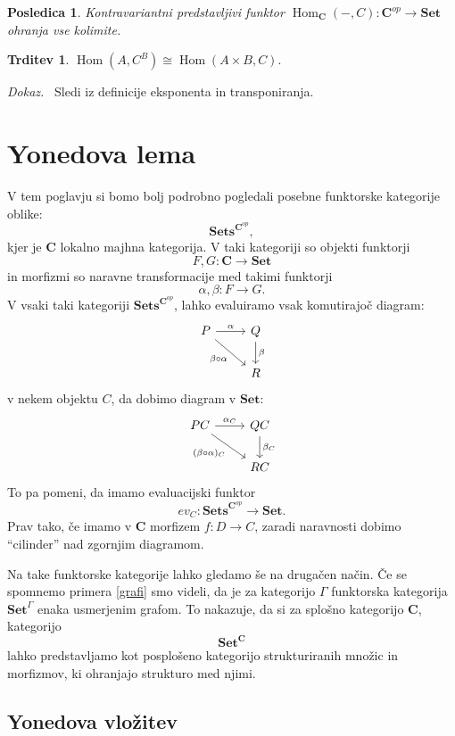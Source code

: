 \documentclass[12pt,a4paper]{book}
\theoremstyle{definition}
\theoremstyle{plain}
\newtheorem{trditev}[definicija]{Trditev}
\newtheorem{posledica}{Posledica}[definicija]
\newenvironment{dokaz}{\emph{Dokaz.}\ }{\hspace{\fill}{$\Box$}}
\theoremstyle{definition}
\theoremstyle{remark}
\newcommand{\cat}[1]{\textbf{#1}}
\DeclareMathOperator{\Hom}{Hom}
\newcommand{\predsnop}[1]{\cat{Sets}^{\cat{#1}^{op}}}
\begin{document}
\begin{posledica}
Kontravariantni predstavljivi funktor $\Hom_\cat{C}(-,C) : \cat{C}^{op} \to \cat{Set}$ ohranja vse kolimite.
\end{posledica}

\begin{trditev}
$\Hom(A, C^B) \cong \Hom(A \times B, C).$
\end{trditev}
\begin{dokaz}
Sledi iz definicije eksponenta in transponiranja.
\end{dokaz}


\chapter{Yonedova lema}

V tem poglavju si bomo bolj podrobno pogledali posebne funktorske kategorije oblike:
$$\predsnop{C},$$
kjer je $\cat{C}$ lokalno majhna kategorija. V taki kategoriji so objekti funktorji 
$$F,G : \cat{C} \to \cat{Set}$$
in morfizmi so naravne transformacije med takimi funktorji
$$\alpha, \beta : F \to G.$$ 
V vsaki taki kategoriji $\predsnop{C}$, lahko evaluiramo vsak komutirajoč diagram:
%
$$
\begin{tikzcd}
P \ar[r, "\alpha"] \ar[rd, "\beta \circ \alpha"'] & Q \ar[d, "\beta"] \\
& R
\end{tikzcd}
$$
v nekem objektu $C$, da dobimo diagram v $\cat{Set}$:
%
$$
\begin{tikzcd}
PC \ar[r, "\alpha_C"] \ar[rd, "(\beta \circ \alpha)_C"'] & QC \ar[d, "\beta_C"] \\
& RC
\end{tikzcd}
$$
To pa pomeni, da imamo evaluacijski funktor
$$ev_C : \predsnop{C} \to \cat{Set}.$$
Prav tako, če imamo v $\cat{C}$ morfizem $f : D \to C$, zaradi naravnosti dobimo "`cilinder"' nad zgornjim diagramom.


Na take funktorske kategorije lahko gledamo še na drugačen način.
Če se spomnemo primera \ref{grafi} smo videli, da je za kategorijo $\Gamma$ funktorska kategorija $\cat{Set}^\Gamma$ enaka usmerjenim grafom. To nakazuje, da si za splošno kategorijo $\cat{C}$, kategorijo
$$\cat{Set}^\cat{C}$$
lahko predstavljamo kot posplošeno kategorijo strukturiranih množic in morfizmov, ki ohranjajo strukturo med njimi.


\section{Yonedova vložitev}
\end{document}
